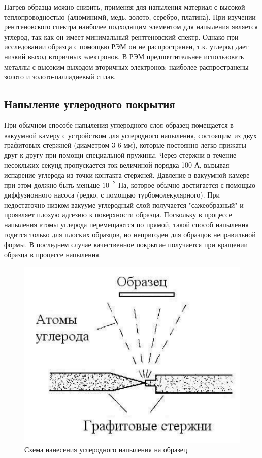 \documentclass[12pt]{article}
\begin{document}
Нагрев образца можно снизить, применяя для напыления материал с высокой теплопроводностью (алюминимй, медь, золото, серебро, платина). При изучении рентгеновского спектра наиболее подходящим элементом для напыления является углерод, так как он имеет минимальный рентгеновский спектр. Однако при исследовании образца с помощью РЭМ он не распространен, т.к. углерод дает низкий выход вторичных электронов. В РЭМ предпочтительнее использовать металлы с высоким выходом вторичных электронов; наиболее распространены золото и золото-палладиевый сплав.  

\subsection*{Напыление углеродного покрытия}

При обычном способе напыления углеродного слоя образец помещается в вакуумной камеру с устройством для углеродного напыления, состоящим из двух графитовых стержней (диаметром 3-6 мм), которые постоянно легко прижаты друг к другу при помощи специальной пружины. Через стержни в течение несокльких секунд пропускается ток величиной порядка 100 А, вызывая испарение углерода из точки контакта стержней. Давление в вакуумной камере при этом должно быть меньше $10^{-2}$ Па, которое обычно достигается с помощью диффузионного насоса (редко, с помощью турбомолекулярного). При недостаточно низком вакууме углеродный слой получается "сажеобразный" и проявляет плохую адгезию к поверхности образца. Поскольку в процессе напыления атомы углерода перемещаются по прямой, такой способ напыления годится только для плоских образцов, но непригоден для образцов неправильной формы. В последнем случае качественное покрытие получается при вращении образца в процессе напыления. 

\begin{figure}[!ht]
\centering
\includegraphics[scale = 0.5]{pictures/graphite.png}
\caption{Схема нанесения углеродного напыления на образец}
\label{tungsten-cathode}
\end{figure}
\end{document}
